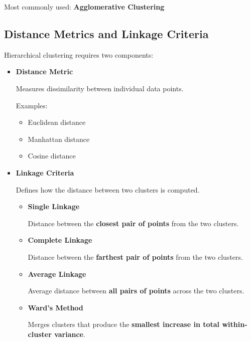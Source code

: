 \documentclass[10pt,a4paper]{article}
\begin{document}
	Most commonly used: \textbf{Agglomerative Clustering}

	\subsection{Distance Metrics and Linkage Criteria}

	Hierarchical clustering requires two components:

	\begin{itemize}

		\item \textbf{Distance Metric}

		Measures dissimilarity between individual data points.

		Examples:

		\begin{itemize}
			\item Euclidean distance
			\item Manhattan distance
			\item Cosine distance
		\end{itemize}

		\item \textbf{Linkage Criteria}

		Defines how the distance between two clusters is computed.

		\begin{itemize}

			\item \textbf{Single Linkage}

			Distance between the \textbf{closest pair of points} from the two clusters.

			\item \textbf{Complete Linkage}

			Distance between the \textbf{farthest pair of points} from the two clusters.

			\item \textbf{Average Linkage}

			Average distance between \textbf{all pairs of points} across the two clusters.

			\item \textbf{Ward’s Method}

			Merges clusters that produce the \textbf{smallest increase in total within-cluster variance}.

		\end{itemize}

	\end{itemize}
\end{document}

